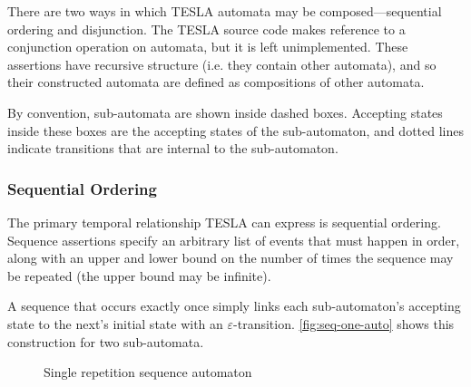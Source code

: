 There are two ways in which TESLA automata may be composed---sequential ordering
and disjunction. The TESLA source code makes reference to a conjunction
operation on automata, but it is left unimplemented. These assertions have
recursive structure (i.e.  they contain other automata), and so their
constructed automata are defined as compositions of other automata.

By convention, sub-automata are shown inside dashed boxes. Accepting states
inside these boxes are the accepting states of the sub-automaton, and dotted
lines indicate transitions that are internal to the sub-automaton.

\subsubsection{Sequential Ordering}

The primary temporal relationship TESLA can express is sequential
ordering. Sequence assertions specify an arbitrary list of events that
must happen in order, along with an upper and lower bound on the number
of times the sequence may be repeated (the upper bound may be infinite).

A sequence that occurs exactly once simply links each sub-automaton's
accepting state to the next's initial state with an
$\varepsilon$-transition.  \autoref{fig:seq-one-auto} shows this
construction for two sub-automata.

\begin{figure}
  \centering
  \caption{Single repetition sequence automaton}
  \label{fig:seq-one-auto}
\end{figure}

